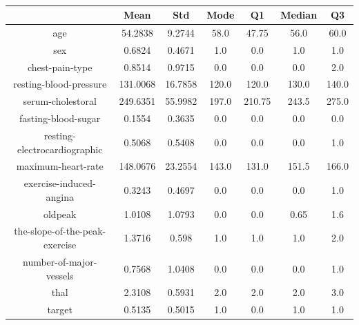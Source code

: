 \documentclass{classrep}
\begin{document}
{{{                \begin{table}[!htbp]
                    \centering
                    \begin{tabular}{|c|c|c|c|c|c|c|}
                        \hline
                        & Mean & Std & Mode & Q1 & Median & Q3 \\ \hline
                        age & 54.2838 & 9.2744 & 58.0 & 47.75 & 56.0 & 60.0 \\ \hline
                        sex & 0.6824 & 0.4671 & 1.0 & 0.0 & 1.0 & 1.0 \\ \hline
                        chest-pain-type & 0.8514 & 0.9715 & 0.0 & 0.0 & 0.0 & 2.0 \\ \hline
                        resting-blood-pressure & 131.0068 & 16.7858 & 120.0 & 120.0 & 130.0 & 140.0 \\ \hline
                        serum-cholestoral & 249.6351 & 55.9982 & 197.0 & 210.75 & 243.5 & 275.0 \\ \hline
                        fasting-blood-sugar & 0.1554 & 0.3635 & 0.0 & 0.0 & 0.0 & 0.0 \\ \hline
                        resting-electrocardiographic & 0.5068 & 0.5408 & 0.0 & 0.0 & 0.0 & 1.0 \\ \hline
                        maximum-heart-rate & 148.0676 & 23.2554 & 143.0 & 131.0 & 151.5 & 166.0 \\ \hline
                        exercise-induced-angina & 0.3243 & 0.4697 & 0.0 & 0.0 & 0.0 & 1.0 \\ \hline
                        oldpeak & 1.0108 & 1.0793 & 0.0 & 0.0 & 0.65 & 1.6 \\ \hline
                        the-slope-of-the-peak-exercise & 1.3716 & 0.598 & 1.0 & 1.0 & 1.0 & 2.0 \\ \hline
                        number-of-major-vessels & 0.7568 & 1.0408 & 0.0 & 0.0 & 0.0 & 1.0 \\ \hline
                        thal & 2.3108 & 0.5931 & 2.0 & 2.0 & 2.0 & 3.0 \\ \hline
                        target & 0.5135 & 0.5015 & 1.0 & 0.0 & 1.0 & 1.0 \\ \hline
                    \end{tabular}
                    \caption{}
                    \label{result_5_List-wise-deletion}
                \end{table}
                \FloatBarrier

}}}
\end{document}

